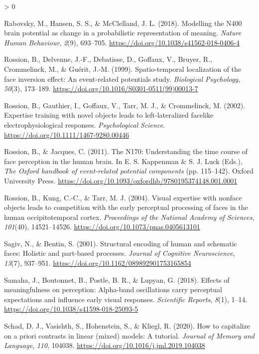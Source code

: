 \documentclass[
  english,
  doc,12pt,twoside,floatsintext]{apa7}
\newlength{\cslhangindent}
\newenvironment{CSLReferences}[2] %
 {%
  \setlength{\parindent}{0pt}
  \ifodd #1 \everypar{\setlength{\hangindent}{\cslhangindent}}\ignorespaces\fi
  \ifnum #2 > 0
  \setlength{\parskip}{#2\baselineskip}
  \fi
 }%
 {}
\begin{document}
\begin{CSLReferences}{1}{0}
\leavevmode\hypertarget{ref-rabovsky2018}{}%
Rabovsky, M., Hansen, S. S., \& McClelland, J. L. (2018). Modelling the {N400} brain potential as change in a probabilistic representation of meaning. \emph{Nature Human Behaviour}, \emph{2}(9), 693--705. \url{https://doi.org/10.1038/s41562-018-0406-4}

\leavevmode\hypertarget{ref-rossion1999}{}%
Rossion, B., Delvenne, J.-F., Debatisse, D., Goffaux, V., Bruyer, R., Crommelinck, M., \& Guérit, J.-M. (1999). Spatio-temporal localization of the face inversion effect: An event-related potentials study. \emph{Biological Psychology}, \emph{50}(3), 173--189. \url{https://doi.org/10.1016/S0301-0511(99)00013-7}

\leavevmode\hypertarget{ref-rossion2002}{}%
Rossion, B., Gauthier, I., Goffaux, V., Tarr, M. J., \& Crommelinck, M. (2002). Expertise training with novel objects leads to left-lateralized facelike electrophysiological responses. \emph{Psychological Science}. \url{https://doi.org/10.1111/1467-9280.00446}

\leavevmode\hypertarget{ref-rossion2011}{}%
Rossion, B., \& Jacques, C. (2011). The {N170}: Understanding the time course of face perception in the human brain. In E. S. Kappenman \& S. J. Luck (Eds.), \emph{The {Oxford} handbook of event-related potential components} (pp. 115--142). Oxford University Press. \url{https://doi.org/10.1093/oxfordhb/9780195374148.001.0001}

\leavevmode\hypertarget{ref-rossion2004}{}%
Rossion, B., Kung, C.-C., \& Tarr, M. J. (2004). Visual expertise with nonface objects leads to competition with the early perceptual processing of faces in the human occipitotemporal cortex. \emph{Proceedings of the National Academy of Sciences}, \emph{101}(40), 14521--14526. \url{https://doi.org/10.1073/pnas.0405613101}

\leavevmode\hypertarget{ref-sagiv2001}{}%
Sagiv, N., \& Bentin, S. (2001). Structural encoding of human and schematic faces: Holistic and part-based processes. \emph{Journal of Cognitive Neuroscience}, \emph{13}(7), 937--951. \url{https://doi.org/10.1162/089892901753165854}

\leavevmode\hypertarget{ref-samaha2018}{}%
Samaha, J., Boutonnet, B., Postle, B. R., \& Lupyan, G. (2018). Effects of meaningfulness on perception: Alpha-band oscillations carry perceptual expectations and influence early visual responses. \emph{Scientific Reports}, \emph{8}(1), 1--14. \url{https://doi.org/10.1038/s41598-018-25093-5}

\leavevmode\hypertarget{ref-schad2020}{}%
Schad, D. J., Vasishth, S., Hohenstein, S., \& Kliegl, R. (2020). How to capitalize on a priori contrasts in linear (mixed) models: A tutorial. \emph{Journal of Memory and Language}, \emph{110}, 104038. \url{https://doi.org/10.1016/j.jml.2019.104038}


\end{CSLReferences}
\end{document}
